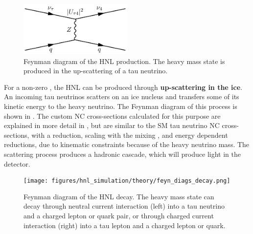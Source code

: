 \begin{figure}[h]
    \includegraphics[width=0.5\textwidth]{figures/hnl_simulation/theory/feyn_diags_production.png}
    \caption[Feynman diagram of heavy neutral lepton production]{Feynman diagram of the HNL production. The heavy mass state is produced in the up-scattering of a tau neutrino.}
\end{figure}

For a non-zero , the HNL can be produced through \textbf{up-scattering in the ice}. An incoming tau neutrinos scatters on an ice nucleus and transfers some of its kinetic energy to the heavy neutrino. The Feynman diagram of this process is shown in . The custom NC cross-sections calculated for this purpose are explained in more detail in , but are similar to the SM tau neutrino NC cross-sections, with a reduction, scaling with the mixing , and energy dependent reductions, due to kinematic constraints because of the heavy neutrino mass. The scattering process produces a hadronic cascade, which will produce light in the detector.

\begin{figure}[h]
    \texttt{[image: figures/hnl\_simulation/theory/feyn\_diags\_decay.png]}
    \caption[Feynman diagram of heavy neutral lepton decay]{Feynman diagram of the HNL decay. The heavy mass state can decay through neutral current interaction (left) into a tau neutrino and a charged lepton or quark pair, or through charged current interaction (right) into a tau lepton and a charged lepton or quark.}
\end{figure}

